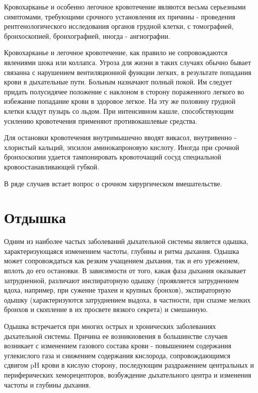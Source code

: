\documentclass[a4paper,14pt]{extreport}
\begin{document}
Кровохарканье и особенно легочное кровотечение являются весьма серьезными симптомами, требующими срочного установления их причины - проведения рентгенологического исследования органов грудной клетки, с томографией, бронхоскопией, бронхографией, иногда - ангиографии.

Кровохарканье и легочное кровотечение, как правило не сопровождаются явлениями шока или коллапса. Угроза для жизни в таких случаях обычно бывает связанна с нарушением вентиляционной функции легких, в результате попадания крови в дыхательные пути. Больным назначают полный покой. Им следует придать полусидячее положение с наклоном в сторону пораженного легкого во избежание  попадание крови в здоровое легкое. На эту же половину грудной клетки кладут пузырь со льдом. При интенсивном кашле, способствующим усилению кровотечения применяют противокашлевые средства.

Для остановки кровотечения внутримышечно вводят викасол, внутривенно - хлористый кальций, эпсилон аминокапроновую кислоту. Иногда при срочной бронхоскопии удается тампонировать кровоточащий сосуд специальной кровоостанавливающей губкой. 

В ряде случаев встает вопрос о срочном хирургическом вмешательстве.

\section{Отдышка}

Одним из наиболее частых заболеваний дыхательной системы является одышка, характеризующаяся изменением частоты, глубины и ритма дыхания. Одышка может сопровождаться как резким учащением дыхания, так и его урежением, вплоть до его остановки. В зависимости от того, какая фаза дыхания оказывает затрудненной, различают инспираторную одышку (проявляется затруднением вдоха, например, при сужение трахеи и крупных бронхов), экспираторную одышку (характеризуются затруднением выдоха, в частности, при спазме мелких бронхов и скопление в их просвете вязкого секрета) и смешанную.

Одышка встречается при многих острых и хронических заболеваниях дыхательной системы. Причина ее возникновения в большинстве случаев возникает с изменением газового состава крови - повышением содержания углекислого газа и снижением содержания кислорода, сопровождающимся сдвигом pH крови в кислую сторону, последующим раздражением центральных и периферических хеморецепторов, возбуждение дыхательного центра и изменения частоты и глубины дыхания.
\end{document}
